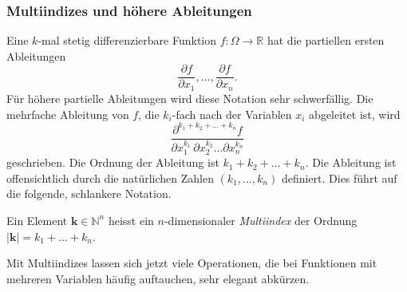 \subsubsection{Multiindizes und höhere Ableitungen}
Eine $k$-mal stetig differenzierbare Funktion $f\colon\Omega\to \mathbb{R}$ 
hat die partiellen ersten Ableitungen
\[
\frac{\partial f}{\partial x_1},
\dots,
\frac{\partial f}{\partial x_n}.
\]
Für höhere partielle Ableitungen wird diese Notation sehr schwerfällig.
Die mehrfache Ableitung von $f$, die $k_i$-fach nach der Variablen $x_i$
abgeleitet ist, wird
\[
\frac{
\partial^{k_1+k_2+\dots+k_n} f
}{
\partial x_1^{k_1}\,\partial x_2^{k_2} \dots \partial x_n^{k_n}
}
\]
geschrieben.
Die Ordnung der Ableitung ist $k_1+k_2+\dots+k_n$.
Die Ableitung ist offensichtlich durch die natürlichen Zahlen
$(k_1,\dots,k_n)$ definiert.
Dies führt auf die folgende, schlankere Notation.

\begin{definition}[Multiindex]
Ein Element $\bm{k}\in \mathbb{N}^n$ heisst ein $n$-dimensionaler
{\em Multiindex} der Ordnung $|\bm{k}|= k_1+\dots+k_n$.
%
\end{definition}

Mit Multiindizes lassen sich jetzt viele Operationen, die bei
Funktionen mit mehreren Variablen häufig auftauchen, sehr elegant
abkürzen.

